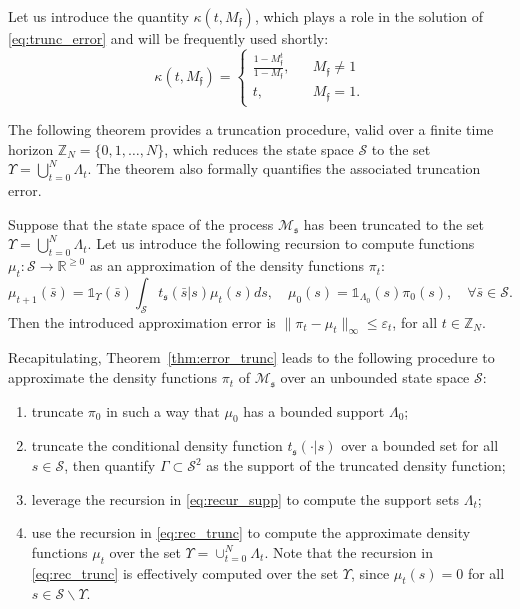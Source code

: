 \documentclass{LMCS}
\begin{document}
Let us introduce the quantity $\kappa(t,M_{\mathfrak f})$, which plays a role in the solution of \eqref{eq:trunc_error} and will be frequently used shortly:
\begin{equation}
\label{eq:kappa}
\kappa(t,M_{\mathfrak f}) = \left\{
\begin{array}{lll}
\frac{1-M_{\mathfrak f}^t}{1-M_{\mathfrak f}}, & & M_{\mathfrak f}\ne 1\\
t, & & M_{\mathfrak f} = 1.
\end{array}
\right.
\end{equation}

The following theorem provides a truncation procedure, 
valid over a finite time horizon $\mathbb Z_N = \{0,1,\ldots,N\}$, 
which reduces the state space $\mathcal S$ to the set $\Upsilon=\bigcup_{t=0}^{N}\Lambda_t$. 
The theorem also formally quantifies the associated truncation error. 

\begin{thm}
\label{thm:error_trunc}
Suppose that the state space of the process $\mathscr M_{\mathfrak s}$ has been truncated to the set $\Upsilon=\bigcup_{t=0}^{N}\Lambda_t$. 
Let us introduce the following recursion to compute functions $\mu_t:\mathcal S\rightarrow\mathbb R^{\ge 0}$ as an approximation of the density functions $\pi_t$: 
\begin{equation}
\label{eq:rec_trunc}
\mu_{t+1}(\bar s) = \mathds 1_{\Upsilon}(\bar s)\int_{\mathcal S}t_{\mathfrak s}(\bar s|s)\mu_t(s)ds,
\quad \mu_0(s) = \mathds 1_{\Lambda_0}(s)\pi_0(s), 
\quad\forall \bar s\in\mathcal S.
\end{equation}
Then the introduced approximation error is
$\|\pi_t-\mu_t\|_{\infty}\le \varepsilon_t$,
for all $t\in\mathbb Z_N$.
\end{thm}
Recapitulating,  
Theorem~\ref{thm:error_trunc} leads to the following procedure to approximate the density functions $\pi_t$ of $\mathscr M_{\mathfrak s}$ over an unbounded state space $\mathcal S$: 
\begin{enumerate}
\item truncate $\pi_0$ in such a way that $\mu_0$ has a bounded support $\Lambda_0$; 
\item truncate the conditional density function $t_{\mathfrak s}(\cdot |s)$ over
a bounded set for all $s\in\mathcal S$, 
then quantify $\varGamma\subset\mathcal S^2$ as the support of the truncated density function;
\item leverage the recursion in \eqref{eq:recur_supp} to compute the support sets $\Lambda_t$; 
\item use the recursion in \eqref{eq:rec_trunc} to compute the approximate density functions $\mu_{t}$ over the set $\Upsilon = \cup_{t=0}^{N}\Lambda_t$.
Note that the recursion in \eqref{eq:rec_trunc} is effectively computed over the set $\Upsilon$, since $\mu_t(s) = 0$ for all $s\in\mathcal S\backslash\Upsilon$.  
\end{enumerate}
\end{document}
